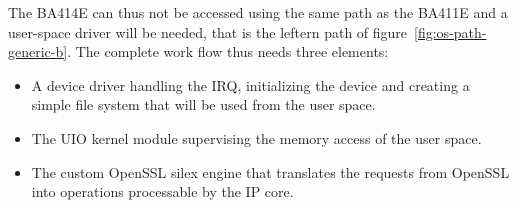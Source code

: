 \noindent The BA414E can thus not be accessed using the same path as the BA411E and a user-space driver will be needed, that is the leftern path of figure~\ref{fig:os-path-generic-b}.
The complete work flow thus needs three elements:
\begin{itemize}
	\item A device driver handling the IRQ, initializing the device and creating a simple file system that will be used from the user space.
	\item The UIO kernel module supervising the memory access of the user space.
	\item The custom OpenSSL silex engine that translates the requests from OpenSSL into operations processable by the IP core.
\end{itemize}

